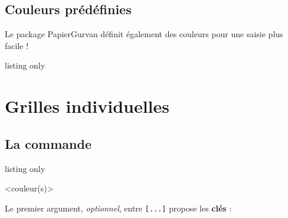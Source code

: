 \documentclass[a4paper]{article}
\newcommand\Cle[1]{{\bfseries\sffamily\textlangle #1\textrangle}}
\begin{document}
%
%
%
%
%
%

\pagebreak

\subsection{Couleurs prédéfinies}

Le package \textsf{PapierGurvan} définit également des couleurs pour une saisie plus facile !

\begin{PresentationCode}{listing only}
\def\ColGgurvan{gray!75/GurvanBleuFonce/GurvanBleuCiel}%
\end{PresentationCode}

\section{Grilles individuelles}

\subsection{La commande}

\begin{PresentationCode}{listing only}

\PapierGurvan[clés]<couleur(s)>
\end{PresentationCode}

Le premier argument, \textit{optionnel}, entre \texttt{[...]} propose les \Cle{clés} :
\end{document}
